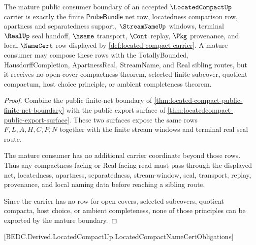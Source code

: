 \begin{theorem}
\label{thm:located-compact-mature-consumer-boundary}
The mature public consumer boundary of an accepted $\LocatedCompactUp$ carrier is exactly the finite $\mathsf{ProbeBundle}$ net row, locatedness comparison row, apartness and separatedness support, $\StreamNameUp$ windows, terminal $\RealUp$ seal handoff, $\hsame$ transport, $\Cont$ replay, $\Pkg$ provenance, and local $\NameCert$ row displayed by \autoref{def:located-compact-carrier}. A mature consumer may compose these rows with the TotallyBounded, HausdorffCompletion, ApartnessReal, StreamName, and Real sibling routes, but it receives no open-cover compactness theorem, selected finite subcover, quotient compactum, host choice principle, or ambient completeness theorem.
\end{theorem}
\begin{proof}
Combine the public finite-net boundary of \autoref{thm:located-compact-public-finite-net-boundary} with the public export surface of \autoref{thm:locatedcompact-public-export-surface}. These two surfaces expose the same rows $F,L,A,H,C,P,N$ together with the finite stream windows and terminal real seal route.

The mature consumer has no additional carrier coordinate beyond those rows. Thus any compactness-facing or Real-facing read must pass through the displayed net, locatedness, apartness, separatedness, stream-window, seal, transport, replay, provenance, and local naming data before reaching a sibling route.

Since the carrier has no row for open covers, selected subcovers, quotient compacta, host choice, or ambient completeness, none of those principles can be exported by the mature boundary.
\end{proof}

[BEDC.Derived.LocatedCompactUp.LocatedCompactNameCertObligations]

